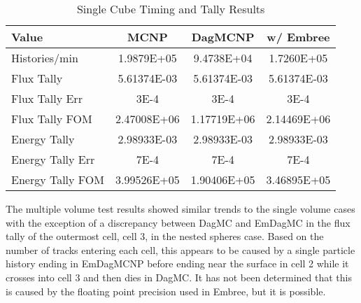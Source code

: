 \documentclass{anstrans}
\begin{document}
\begin{table}[H]

  \begin{center}
    \caption{Single Cube Timing and Tally Results}

    \begin{tabular}{lccc}
     \toprule
      Value & MCNP & DagMCNP & w/ Embree \\
     \toprule
      Histories/min & 1.9879E+05 & 9.4738E+04 & 1.7260E+05  \\
      Flux Tally & 5.61374E-03 & 5.61374E-03 & 5.61374E-03 \\
      Flux Tally Err & 3E-4 & 3E-4 & 3E-4  \\
      Flux Tally FOM & 2.47008E+06 & 1.17719E+06 & 2.14469E+06 \\
      Energy Tally & 2.98933E-03 & 2.98933E-03 & 2.98933E-03 \\
      Energy Tally Err & 7E-4 & 7E-4 & 7E-4 \\
      Energy Tally FOM & 3.99526E+05 & 1.90406E+05 & 3.46895E+05 \\
      \bottomrule
      
    \end{tabular}


  \end{center}

\end{table}

The multiple volume test results showed similar trends to the single volume cases with the exception of a discrepancy between DagMC and EmDagMC in the flux tally of the outermost cell, cell 3, in the nested spheres case. Based on the number of tracks entering each cell, this appears to be caused by a single particle history ending in EmDagMCNP before ending near the surface in cell 2 while it crosses into cell 3 and then dies in DagMC. It has not been determined that this is caused by the floating point precision used in Embree, but it is possible.
\end{document}
